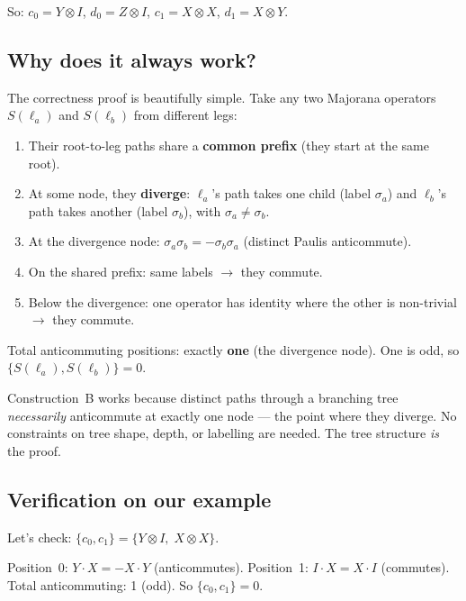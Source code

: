 \documentclass[11pt,a4paper]{article}
\theoremstyle{definition}
\begin{document}
So: $c_0 = Y \otimes I$, \; $d_0 = Z \otimes I$, \;
$c_1 = X \otimes X$, \; $d_1 = X \otimes Y$.

\subsection{Why does it always work?}

The correctness proof is beautifully simple.  Take any two Majorana
operators $S(\ell_a)$ and $S(\ell_b)$ from different legs:

\begin{enumerate}
  \item Their root-to-leg paths share a \textbf{common prefix} (they
    start at the same root).
  \item At some node, they \textbf{diverge}: $\ell_a$'s path takes one
    child (label $\sigma_a$) and $\ell_b$'s path takes another
    (label $\sigma_b$), with $\sigma_a \neq \sigma_b$.
  \item At the divergence node: $\sigma_a \sigma_b = -\sigma_b
    \sigma_a$ (distinct Paulis anticommute).
  \item On the shared prefix: same labels $\to$ they commute.
  \item Below the divergence: one operator has identity where the
    other is non-trivial $\to$ they commute.
\end{enumerate}

Total anticommuting positions: exactly \textbf{one} (the divergence
node).  One is odd, so $\{S(\ell_a), S(\ell_b)\} = 0$.  \checkmark

\begin{keyinsight}
Construction~B works because distinct paths through a branching tree
\emph{necessarily} anticommute at exactly one node --- the point where
they diverge.  No constraints on tree shape, depth, or labelling are
needed.  The tree structure \emph{is} the proof.
\end{keyinsight}

\subsection{Verification on our example}

Let's check: $\{c_0, c_1\} = \{Y \otimes I,\; X \otimes X\}$.

Position~0: $Y \cdot X = -X \cdot Y$ (anticommutes).
Position~1: $I \cdot X = X \cdot I$ (commutes).
Total anticommuting: 1 (odd).  So $\{c_0, c_1\} = 0$. \checkmark
\end{document}
